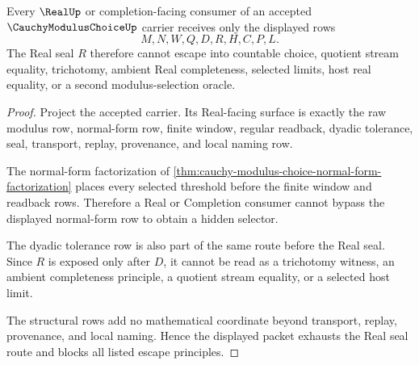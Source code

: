 \begin{theorem}
\label{thm:cauchy-modulus-choice-real-seal-nonescape}
Every $\RealUp$ or completion-facing consumer of an accepted $\CauchyModulusChoiceUp$ carrier receives only the displayed rows
$$
M,N,W,Q,D,R,H,C,P,L .
$$
The Real seal $R$ therefore cannot escape into countable choice, quotient stream equality, trichotomy, ambient Real completeness, selected limits, host real equality, or a second modulus-selection oracle.
\end{theorem}
\begin{proof}
Project the accepted carrier. Its Real-facing surface is exactly the raw modulus row, normal-form row, finite window, regular readback, dyadic tolerance, seal, transport, replay, provenance, and local naming row.

The normal-form factorization of \autoref{thm:cauchy-modulus-choice-normal-form-factorization} places every selected threshold before the finite window and readback rows. Therefore a Real or Completion consumer cannot bypass the displayed normal-form row to obtain a hidden selector.

The dyadic tolerance row is also part of the same route before the Real seal. Since $R$ is exposed only after $D$, it cannot be read as a trichotomy witness, an ambient completeness principle, a quotient stream equality, or a selected host limit.

The structural rows add no mathematical coordinate beyond transport, replay, provenance, and local naming. Hence the displayed packet exhausts the Real seal route and blocks all listed escape principles.
\end{proof}


\begin{closurestatus}{\CauchyModulusChoiceUp}
  \theoryclosure{\seedClosure}
  \formalstatus{\unformalizedV}
\end{closurestatus}
